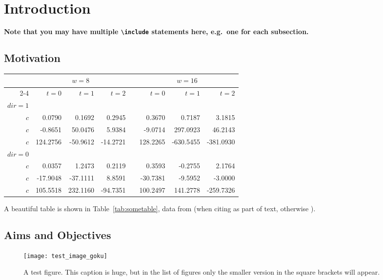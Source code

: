 \chapter{Introduction}

\textbf{Note that you may have multiple \texttt{{\textbackslash}include} statements here, e.g.\ one for each subsection.}

\section{Motivation} %
\blindtext

\begin{table*}\centering
{}
\begin{tabular}{@{}rrrrcrrr@{}}\toprule
& \multicolumn{3}{c}{$w = 8$} & \phantom{abc}& \multicolumn{3}{c}{$w = 16$} \\
\cmidrule{2-4} \cmidrule{6-8} 
& $t=0$ & $t=1$ & $t=2$ && $t=0$ & $t=1$ & $t=2$\\ \midrule
$dir=1$\\
$c$ & 0.0790 & 0.1692 & 0.2945 && 0.3670 & 0.7187 & 3.1815\\
$c$ & -0.8651& 50.0476& 5.9384&& -9.0714& 297.0923& 46.2143\\
$c$ & 124.2756& -50.9612& -14.2721&& 128.2265& -630.5455& -381.0930\\
$dir=0$\\
$c$ & 0.0357& 1.2473& 0.2119&& 0.3593& -0.2755& 2.1764\\
$c$ & -17.9048& -37.1111& 8.8591&& -30.7381& -9.5952& -3.0000\\
$c$ & 105.5518& 232.1160& -94.7351&& 100.2497& 141.2778& -259.7326\\
\bottomrule
\end{tabular}
\caption{A Beautiful and Complex Table}\label{tab:sometable}
\end{table*}

A beautiful table is shown in Table~\ref{tab:sometable}, data from \citet{Ebejer2012} (when citing as part of text, otherwise \citep{Ebejer2012}).

\section{Aims and Objectives} 
\blindtext

\begin{figure}[ht!] %
  \centering
  \texttt{[image: test\_image\_goku]}
  \caption[This is the short caption for List of Figures]{A test figure.  This caption is huge, but in the list of figures only the smaller version in the square brackets will appear.}
  \label{fig:test1}
\end{figure}

